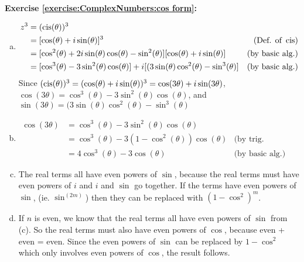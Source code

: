 \noindent\textbf{Exercise \ref{exercise:ComplexNumbers:cos form}:} %
\begin{enumerate}[(a)]
\item
	\begin{align*}
	z^{3}&= (\cis(\theta))^{3}&\\
	&= [\cos(\theta) + i\sin(\theta)]^{3} &\text{(Def. of}\ \cis)\\
	&= [\cos^{2}(\theta) + 2i\sin(\theta)\cos(\theta) - \sin^{2}(\theta)][\cos(\theta) + i\sin(\theta)] &	\text{(by basic alg.)}\\
	&= [\cos^{3}(\theta) - 3\sin^{2}(\theta)\cos(\theta)] + i[(3\sin(\theta)\cos^{2}(\theta) - \sin^{3}	(\theta)] &\text{(by basic alg.)}
	\end{align*}
	Since $(\operatorname{cis}(\theta))^3 = (\cos(\theta) + i\sin(\theta))^{3} = \cos(3\theta) + i\sin(3\theta)$,\\
	$\cos(3\theta) = \cos^{3}(\theta) - 3\sin^{2}(\theta)\cos(\theta)$, and\\ $\sin(3\theta) = 	(3\sin(\theta)\cos^{2}(\theta) - \sin^{3}(\theta)$

\item
	\begin{align*}
	\cos(3\theta)&= \cos^{3}(\theta) - 3\sin^{2}(\theta)\cos(\theta)&\\
	&= \cos^{3}(\theta) - 3(1-\cos^{2}(\theta))\cos(\theta)& \text{(by trig. identities)}\\
	&= 4\cos^{3}(\theta) - 3\cos(\theta)& \text{(by basic alg.)}
	\end{align*}

\item
The real terms all have even powers of $\sin$, because the real terms must have even powers of $i$ and $i$ and $\sin$ go together. If the terms have even powers of $\sin$, (ie. $\sin ^{(2m)}$) then they can be replaced with $(1-\cos^2)^m$. 

\item
If $n$ is even, we know that the real terms all have even powers of $\sin$ from (c).  So the real terms must also have even powers of $\cos$, because even + even = even.  Since the even powers of $\sin$ can be replaced by $1- \cos^2$ which only involves even powers of $\cos$, the result follows.
\end{enumerate}

